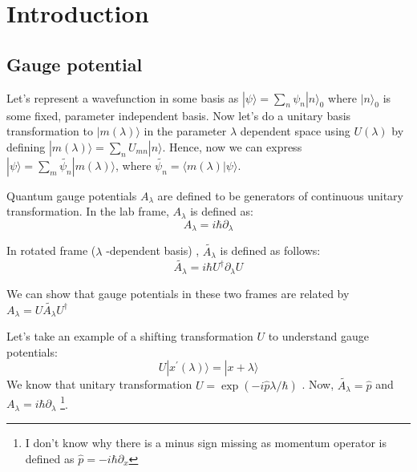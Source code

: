 \documentclass[11pt,a4paper]{article}
\begin{document}

 

\section{Introduction}

\subsection{Gauge potential}
Let's represent a wavefunction in some basis as $|\psi \rangle= \sum_n \psi_n |n \rangle_0$
where $|n \rangle_0$ is some fixed, parameter independent basis. Now let's do a unitary basis transformation to $|m (\lambda) \rangle$ in the parameter $\lambda$ dependent space using $U(\lambda)$ by defining $|m (\lambda) \rangle= \sum_n U_{mn} |n \rangle$. Hence, now we can express $|\psi \rangle = \sum_m \tilde{\psi_n}  |m (\lambda) \rangle $, where $\tilde{\psi_n}= \langle  m (\lambda) |\psi \rangle$. 
 
Quantum gauge potentials $A_{\lambda}$ are defined to be generators of continuous unitary transformation. In the lab frame, $A_{\lambda}$ is defined as:
\begin{equation}
\boxed{A_{\lambda}=  i \hbar \partial_{\lambda}}
\end{equation}

In rotated frame ($\lambda$ -dependent basis) , $\tilde{A_{\lambda}}$ is defined as follows:
\begin{equation}
\boxed{\tilde{A_{\lambda}}= i \hbar U^{\dagger} \partial_{\lambda} U}
\end{equation}


We can show that gauge potentials in these two frames are related by $A_{\lambda}= U \tilde{A_{\lambda}} U^{\dagger}$


Let's take an example of a shifting transformation $U$ to understand gauge potentials:
\begin{equation}
U |x^{\prime} (\lambda) \rangle =|x + \lambda \rangle
\end{equation}
We know that unitary transformation $U= \exp( - i \hat{p} \lambda/ \hbar)$ . Now, $\tilde{A_{\lambda}} =\hat{p}$ and $A_{\lambda}= i \hbar \partial_{\lambda}$ \footnote{I don't know why there is a minus sign missing as momentum operator is defined as $\hat{p}= - i \hbar \partial_{x}$}. 
\end{document}
